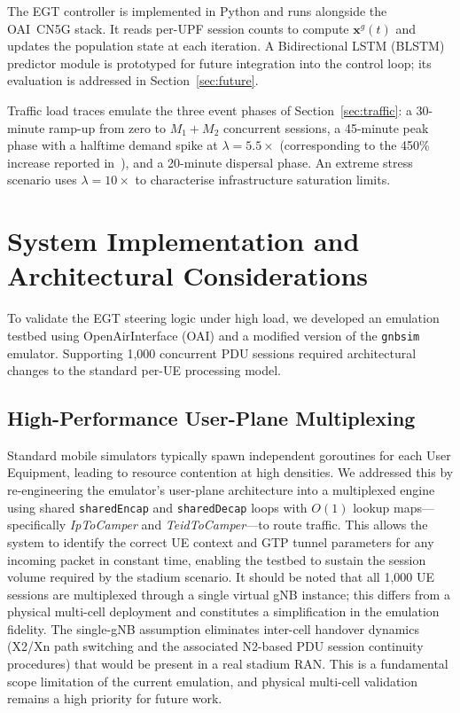 \documentclass[conference]{IEEEtran}
\begin{document}
The EGT controller is implemented in Python and runs
alongside the OAI~CN5G stack. It reads per-UPF session
counts to compute $\mathbf{x}^g(t)$ and updates the
population state at each iteration. A Bidirectional LSTM
(BLSTM) predictor module is prototyped for future
integration into the control loop; its evaluation is
addressed in Section~\ref{sec:future}.

Traffic load traces emulate the three event phases of
Section~\ref{sec:traffic}: a 30-minute ramp-up from zero
to $M_1 + M_2$ concurrent sessions, a 45-minute peak
phase with a halftime demand spike at $\lambda = 5.5\times$
(corresponding to the 450\% increase reported
in~\cite{superbowl_lvii}), and a 20-minute dispersal
phase. An extreme stress scenario uses $\lambda = 10\times$
to characterise infrastructure saturation limits.

\section{System Implementation and Architectural Considerations}
\label{sec:implementation}

To validate the EGT steering logic under high load, we
developed an emulation testbed using OpenAirInterface
(OAI) and a modified version of the \texttt{gnbsim}
emulator. Supporting 1,000 concurrent PDU sessions
required architectural changes to the standard
per-UE processing model.

\subsection{High-Performance User-Plane Multiplexing}

Standard mobile simulators typically spawn independent
goroutines for each User Equipment, leading to resource
contention at high densities. We addressed this by
re-engineering the emulator's user-plane architecture
into a multiplexed engine using shared
\texttt{sharedEncap} and \texttt{sharedDecap} loops with
$O(1)$ lookup maps---specifically \textit{IpToCamper}
and \textit{TeidToCamper}---to route traffic. This
allows the system to identify the correct UE context
and GTP tunnel parameters for any incoming packet in
constant time, enabling the testbed to sustain the
session volume required by the stadium scenario.
It should be noted that all 1,000 UE sessions are
multiplexed through a single virtual gNB instance;
this differs from a physical multi-cell deployment and
constitutes a simplification in the emulation fidelity.
The single-gNB assumption eliminates inter-cell handover
dynamics (X2/Xn path switching and the associated N2-based
PDU session continuity procedures) that would be present
in a real stadium RAN. This is a fundamental scope
limitation of the current emulation, and physical
multi-cell validation remains a high priority for
future work.
\end{document}

